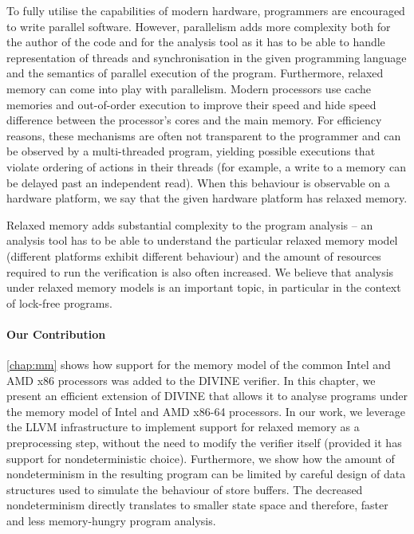 To fully utilise the capabilities of modern hardware, programmers are encouraged to write parallel software.
However, parallelism adds more complexity both for the author of the code and for the analysis tool as it has to be able to handle representation of threads and synchronisation in the given programming language and the semantics of parallel execution of the program.
Furthermore, relaxed memory can come into play with parallelism.
Modern processors use cache memories and out-of-order execution to improve their speed and hide speed difference between the processor's cores and the main memory.
For efficiency reasons, these mechanisms are often not transparent to the programmer and can be observed by a multi-threaded program, yielding possible executions that violate ordering of actions in their threads (for example, a write to a memory can be delayed past an independent read).
When this behaviour is observable on a hardware platform, we say that the given hardware platform has relaxed memory.

Relaxed memory adds substantial complexity to the program analysis --
an analysis tool has to be able to understand the particular relaxed memory model (different platforms exhibit different behaviour) and the amount of resources required to run the verification is also often increased.
We believe that analysis under relaxed memory models is an important topic,
in particular in the context of lock-free programs.

\paragraph{Our Contribution}

\autoref{chap:mm} shows how support for the memory model of the common Intel and AMD x86 processors was added to the DIVINE verifier.
In this chapter, we present an efficient extension of DIVINE that allows it to
analyse programs under the memory model of Intel and AMD x86-64 processors.
In our work, we leverage the LLVM infrastructure to implement support for
relaxed memory as a preprocessing step, without the need to modify the verifier
itself (provided it has support for nondeterministic choice).
Furthermore, we show how the amount of nondeterminism in the resulting program
can be limited by careful design of data structures used to simulate the
behaviour of \xtso store buffers.
The decreased nondeterminism directly translates to smaller state space and therefore, faster and less memory-hungry program analysis.

